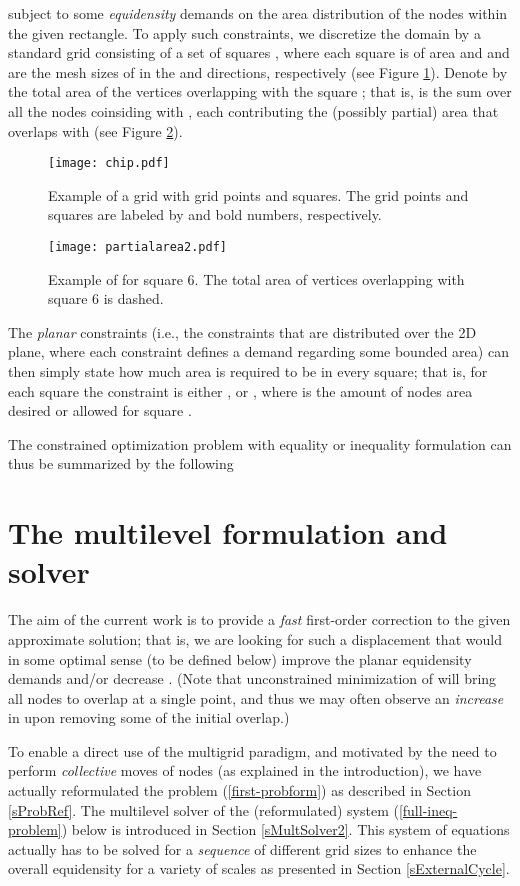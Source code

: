 \documentclass[final]{siamltex}
\begin{document}
subject to some {\it equidensity} demands on the area distribution
of the nodes within the given rectangle. To apply such
constraints, we discretize the domain by a standard grid 
consisting of a set of squares , where each square  is of area  and  and  are the mesh
sizes of  in the  and  directions, respectively (see
Figure \ref{chipgrid}). Denote by  the total area of the
vertices overlapping with the square ; that is,  is
the sum over all the nodes coinsiding with , each contributing
the (possibly partial) area that overlaps with  (see Figure
\ref{partarea2}).
\begin{figure}[h]
\vbox{\center\texttt{[image: chip.pdf]}}
\caption{Example of a grid  with  grid points and 
squares.
The grid points and squares are labeled by  and bold numbers,
respectively.}\label{chipgrid}
\end{figure}
\begin{figure}[h]
\vbox{\center\texttt{[image: partialarea2.pdf]}}
\caption{Example of  for square 6. The total area of vertices
overlapping with square 6 is dashed.} \label{partarea2}
\end{figure}

\par The {\it planar} constraints (i.e., the constraints that are distributed over the 2D plane,
where each constraint defines a demand regarding some bounded
area) can then simply state how much area is required to be in
every square; that is, for each square  the constraint
is either , or , where  is
the amount of nodes area desired or allowed for square .
\par The constrained optimization problem with equality or inequality formulation can thus be summarized by the
following


\section{The multilevel formulation and solver}\label{ml-formulation}
\par The aim of the current work is to provide a {\it fast} first-order
correction to the given approximate solution; that is, we are
looking for such a displacement that would in some optimal sense
(to be defined below) improve the planar equidensity demands
and/or decrease . (Note that unconstrained
minimization of  will bring all nodes to overlap at
a single point, and thus we may often observe an {\it increase} in
 upon removing some of the initial overlap.)
\par To enable a direct use of the multigrid paradigm, and motivated by the
need to perform {\it collective} moves of nodes (as explained in
the introduction), we have actually reformulated the problem
(\ref{first-probform}) as described in Section \ref{sProbRef}. The
multilevel solver of the (reformulated) system
(\ref{full-ineq-problem}) below is introduced in Section
\ref{sMultSolver2}. This system of equations actually has to be
solved for a {\it sequence} of different grid sizes to enhance the
overall equidensity for a variety of scales as presented in
Section \ref{sExternalCycle}.
\end{document}
